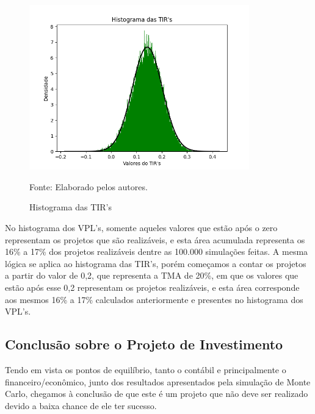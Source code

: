 \documentclass[a4paper,12pt]{article}[abntex2]
\begin{document}
\begin{figure}[H]
\centering
\caption{Histograma das TIR's}
\includegraphics[width=0.85\textwidth]{Histograma das TIR's.png}
\label{fig:my_label}

\footnotesize{Fonte: Elaborado pelos autores.}
\end{figure}

No histograma dos VPL's, somente aqueles valores que estão após o zero representam os projetos que são realizáveis, e esta área acumulada representa os 16\% a 17\% dos projetos realizáveis dentre as 100.000 simulações feitas. A mesma lógica se aplica ao histograma das TIR's, porém começamos a contar os projetos a partir do valor de 0,2, que representa a TMA de 20\%, em que os valores que estão após esse 0,2 representam os projetos realizáveis, e esta área corresponde aos mesmos 16\% a 17\% calculados anteriormente e presentes no histograma dos VPL's.

\subsection{\textbf{Conclusão sobre o Projeto de Investimento}}
Tendo em vista os pontos de equilíbrio, tanto o contábil e principalmente o financeiro/econômico, junto dos resultados apresentados pela simulação de Monte Carlo, chegamos à conclusão de que este é um projeto que não deve ser realizado devido a baixa chance de ele ter sucesso.
\end{document}
